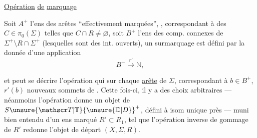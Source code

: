 
  \uline{Opération} \uline{de} \uline{marquage}


 Soit $A^+$ l'ens des arêtes  ``effectivement marquées'',  , correspondant à des $C\in\pi_0(\Sigma)$ telles que $C\cap R\ne\varnothing$, soit $B^+$ l'ens des comp. connexes de $\Sigma^+\setminus R\cap\Sigma^+$ (lesquelles sont des int. ouverts), un surmarquage est défini par la donnée d'une application
\[
 B^+\xrightarrow{r'}\mathbb N,
\]


et peut se décrire   l'opération qui sur chaque \uline{arête}   de $\Sigma$, correspondant à  $b\in B^+$, $r'(b)$ nouveaux sommets de  . Cette fois-ci,  il y a des choix arbitraires --- néanmoins l'opération donne un objet de $S\unsure{\mathscr T|\mathbb T}{\unsure{\mathbb D|D}}^{+}$, défini à isom unique près  --- muni bien entendu d'un ens marqué $R'\subset R_1$, tel que l'opération inverse de gommage de $R'$ redonne l'objet de départ $(X,\Sigma,R)$.

